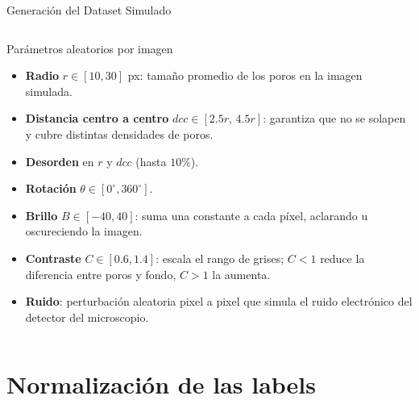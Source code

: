 \documentclass[aspectratio=169, 10pt]{beamer}
\begin{document}
\begin{frame}{Generación del Dataset Simulado}
\begin{columns}[t]
    \begin{block}{Parámetros aleatorios por imagen}
        \small
        \begin{itemize}
            \item \textbf{Radio} $r \in [10,30]$ px: tamaño promedio de los poros en la imagen simulada.
            \item \textbf{Distancia centro a centro} $dcc \in [2.5r,\,4.5r]$: garantiza que no se solapen y cubre distintas densidades de poros.
            \item \textbf{Desorden} en $r$ y $dcc$ (hasta $10\%$).
            \item \textbf{Rotación} $\theta \in [0^\circ,360^\circ]$.
            \item \textbf{Brillo} $B \in [-40,40]$: suma una constante a cada píxel, aclarando u oscureciendo la imagen.
            \item \textbf{Contraste} $C \in [0.6,1.4]$: escala el rango de grises; $C<1$ reduce la diferencia entre poros y fondo, $C>1$ la aumenta.
            \item \textbf{Ruido}: perturbación aleatoria pixel a pixel que simula el ruido electrónico del detector del microscopio.
        \end{itemize}
    \end{block} 




\end{columns}

   


\end{frame}

\section{Normalización de las labels}
\end{document}
